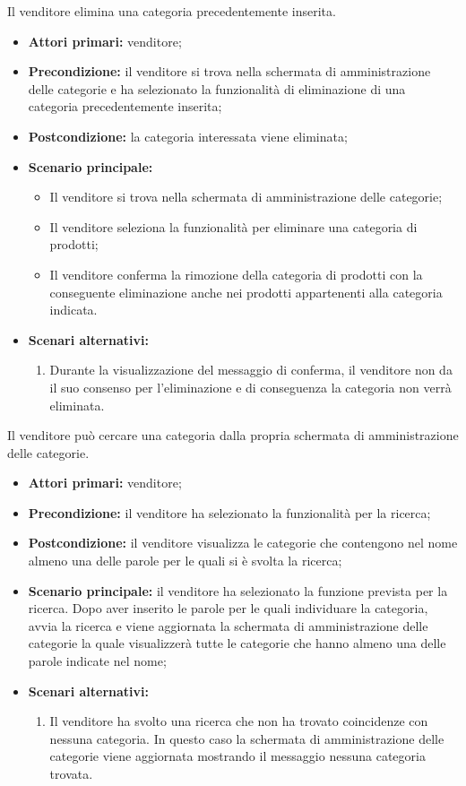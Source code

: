 Il venditore elimina una categoria precedentemente inserita.
\begin{itemize}
    \item \textbf{Attori primari:} venditore;
    \item \textbf{Precondizione:} il venditore si trova nella schermata di amministrazione delle categorie e ha selezionato la funzionalità di eliminazione di una categoria precedentemente inserita;
    \item \textbf{Postcondizione:} la categoria interessata viene eliminata;
    \item \textbf{Scenario principale:}
    \begin{itemize}
    	\item Il venditore si trova nella schermata di amministrazione delle categorie;
    	\item Il venditore seleziona la funzionalità per eliminare una categoria di prodotti;
    	\item Il venditore conferma la rimozione della categoria di prodotti con la conseguente eliminazione anche nei prodotti appartenenti alla categoria indicata.
    \end{itemize}
    \item \textbf{Scenari alternativi:}
    \begin{enumerate}[label=\lett]
    	\item Durante la visualizzazione del messaggio di conferma, il venditore non da il suo consenso per l'eliminazione e di conseguenza la categoria non verrà eliminata.
    \end{enumerate}
\end{itemize}

\label{ricerca-categoria}

Il venditore può cercare una categoria dalla propria schermata di amministrazione delle categorie.
\begin{itemize}
	\item \textbf{Attori primari:} venditore;
	\item \textbf{Precondizione:} il venditore ha selezionato la funzionalità per la ricerca;
	\item \textbf{Postcondizione:} il venditore visualizza le categorie che contengono nel nome almeno una delle parole per le quali si è svolta la ricerca;
	\item \textbf{Scenario principale:} il venditore ha selezionato la funzione prevista per la ricerca. Dopo aver inserito le parole per le quali individuare la categoria, avvia la ricerca e viene aggiornata la schermata di amministrazione delle categorie la quale visualizzerà tutte le categorie che hanno almeno una delle parole indicate nel nome;
	\item \textbf{Scenari alternativi:}
	\begin{enumerate}[label=\lett]
		\item Il venditore ha svolto una ricerca che non ha trovato coincidenze con nessuna categoria. In questo caso la schermata di amministrazione delle categorie viene aggiornata mostrando il messaggio nessuna categoria trovata.
	\end{enumerate}
\end{itemize}